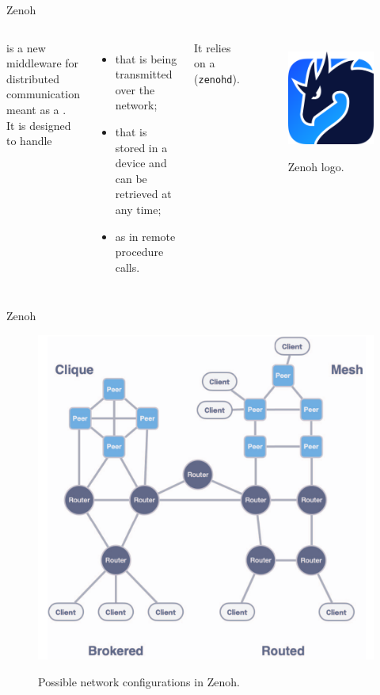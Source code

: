 \begin{frame}{Zenoh}
	\begin{columns}
		 is a new middleware for distributed communication meant as a .\\
		It is designed to handle 
		\begin{itemize}
			\item {} that is being transmitted over the network;
			\item {} that is stored in a device and can be retrieved at any time;
			\item {} as in remote procedure calls.
		\end{itemize}
		It relies on a  (\texttt{zenohd}).

		\begin{figure}
			\centering
			\includegraphics[width=.65\textwidth]{zenoh}
			\label{fig:zenoh}
			\caption{Zenoh logo.}
		\end{figure}
	\end{columns}
\end{frame}
\begin{frame}{Zenoh}
	\begin{figure}
		\centering
		\includegraphics[width=.45\textwidth]{zenoh_networks}
		\label{fig:zenohnets}
		\caption{Possible network configurations in Zenoh.}
	\end{figure}
\end{frame}
